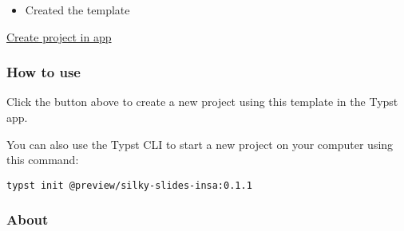 \begin{itemize}
\tightlist
\item
  Created the template
\end{itemize}

\href{/app?template=silky-slides-insa&version=0.1.1}{Create project in
app}

\subsubsection{How to use}\label{how-to-use}

Click the button above to create a new project using this template in
the Typst app.

You can also use the Typst CLI to start a new project on your computer
using this command:

\begin{verbatim}
typst init @preview/silky-slides-insa:0.1.1
\end{verbatim}



\subsubsection{About}\label{about}

